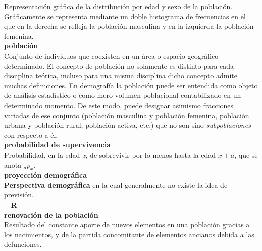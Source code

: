 \begin{multicols}{2}
\vspace{-0.3cm}
Representación gráfica de la distribución por edad y sexo de la población. Gráficamente se representa mediante un doble histograma de frecuencias en el que en la derecha se refleja la población masculina y en la izquierda la población femenina.\\

\noindent \textbf{\Large{poblaci\'on}}\\

\vspace{-0.3cm}
Conjunto de individuos que coexisten en un \'area o espacio geogr\'afico determinado. El concepto de poblaci\'on no solamente es distinto para cada disciplina te\'orica, incluso para una misma disciplina dicho concepto admite muchas definiciones. En demograf\'ia la poblaci\'on puede ser entendida como objeto de an\'alisis estad\'istico o como mero volumen poblacional contabilizado en un determinado momento. De este modo, puede designar asimismo fracciones variadas de ese conjunto (poblaci\'on masculina y poblaci\'on femenina, poblaci\'on urbana y poblaci\'on rural, poblaci\'on activa, etc.) que no son sino \textit{subpoblaciones} con respecto a \'el.\\

\noindent \textbf{\Large{probabilidad de supervivencia}}\\

\vspace{-0.3cm}
Probabilidad, en la edad \textit{x}, de sobrevivir por lo menos hasta la edad $x+a$, que se anota $_{a}p_{x}$.\\

\noindent \textbf{\Large{proyección demográfica}}\\

\vspace{-0.3cm}
\textbf{Perspectiva demográfica} en la cual generalmente no existe la idea de previsión.\\



\noindent\textbf{\huge{-- R --}}\\

\noindent \textbf{\Large{renovación de la población}}\\

\vspace{-0.3cm}
Resultado del constante aporte de nuevos elementos en una población gracias a los nacimientos, y de la partida concomitante de elementos ancianos debida a las defunciones.\\


\end{multicols}
